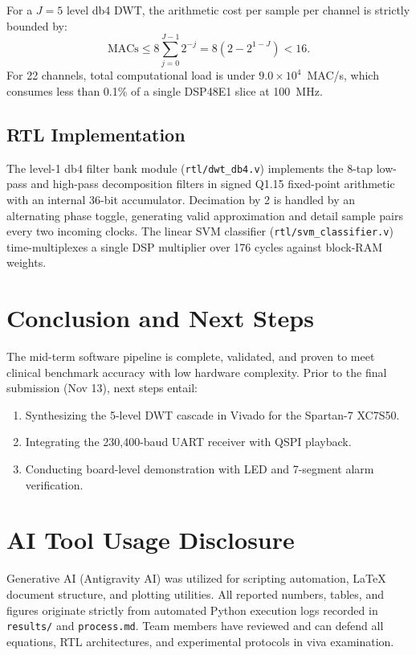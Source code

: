 \documentclass[10pt,twocolumn,letterpaper]{article}
\begin{document}
For a $J=5$ level db4 DWT, the arithmetic cost per sample per channel is strictly bounded by:
\begin{equation}
\text{MACs} \le 8 \sum_{j=0}^{J-1} 2^{-j} = 8 (2 - 2^{1-J}) < 16.
\end{equation}
For 22 channels, total computational load is under $9.0 \times 10^4$~MAC/s, which consumes less than 0.1\% of a single DSP48E1 slice at 100~MHz.

\subsection{RTL Implementation}
The level-1 db4 filter bank module (\texttt{rtl/dwt\_db4.v}) implements the 8-tap low-pass and high-pass decomposition filters in signed Q1.15 fixed-point arithmetic with an internal 36-bit accumulator. Decimation by 2 is handled by an alternating phase toggle, generating valid approximation and detail sample pairs every two incoming clocks. The linear SVM classifier (\texttt{rtl/svm\_classifier.v}) time-multiplexes a single DSP multiplier over 176 cycles against block-RAM weights.

\section{Conclusion and Next Steps}
\label{sec:conclusion}

The mid-term software pipeline is complete, validated, and proven to meet clinical benchmark accuracy with low hardware complexity. Prior to the final submission (Nov 13), next steps entail:
\begin{enumerate}
    \item Synthesizing the 5-level DWT cascade in Vivado for the Spartan-7 XC7S50.
    \item Integrating the 230,400-baud UART receiver with QSPI playback.
    \item Conducting board-level demonstration with LED and 7-segment alarm verification.
\end{enumerate}

\section*{AI Tool Usage Disclosure}
Generative AI (Antigravity AI) was utilized for scripting automation, LaTeX document structure, and plotting utilities. All reported numbers, tables, and figures originate strictly from automated Python execution logs recorded in \texttt{results/} and \texttt{process.md}. Team members have reviewed and can defend all equations, RTL architectures, and experimental protocols in viva examination.

{\small


}
\end{document}
